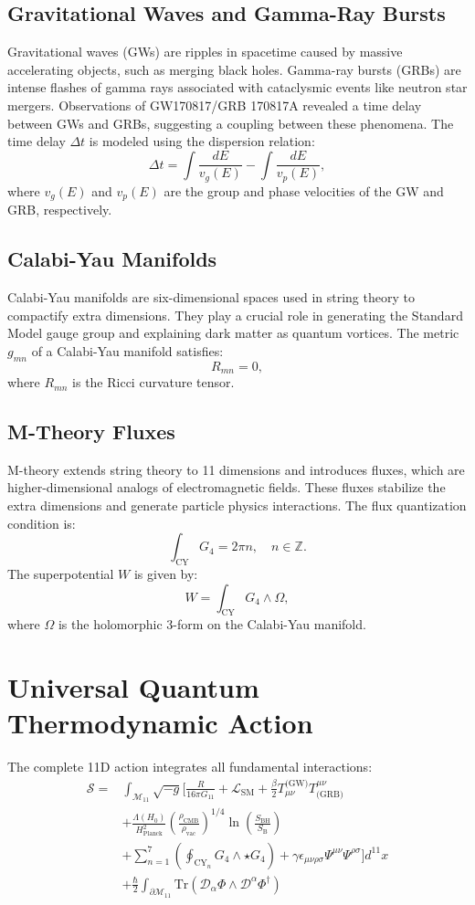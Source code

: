 \documentclass[12pt, a4paper]{article}
\begin{document}
\subsection{Gravitational Waves and Gamma-Ray Bursts}
Gravitational waves (GWs) are ripples in spacetime caused by massive accelerating objects, such as merging black holes. Gamma-ray bursts (GRBs) are intense flashes of gamma rays associated with cataclysmic events like neutron star mergers. Observations of GW170817/GRB 170817A revealed a time delay between GWs and GRBs, suggesting a coupling between these phenomena. The time delay \(\Delta t\) is modeled using the dispersion relation:
\[
\Delta t = \int \frac{dE}{v_g(E)} - \int \frac{dE}{v_p(E)},
\]
where \(v_g(E)\) and \(v_p(E)\) are the group and phase velocities of the GW and GRB, respectively.

\subsection{Calabi-Yau Manifolds}
Calabi-Yau manifolds are six-dimensional spaces used in string theory to compactify extra dimensions. They play a crucial role in generating the Standard Model gauge group and explaining dark matter as quantum vortices. The metric \(g_{mn}\) of a Calabi-Yau manifold satisfies:
\[
R_{mn} = 0,
\]
where \(R_{mn}\) is the Ricci curvature tensor.

\subsection{M-Theory Fluxes}
M-theory extends string theory to 11 dimensions and introduces fluxes, which are higher-dimensional analogs of electromagnetic fields. These fluxes stabilize the extra dimensions and generate particle physics interactions. The flux quantization condition is:
\[
\int_{\text{CY}} G_4 = 2\pi n, \quad n \in \mathbb{Z}.
\]
The superpotential \(W\) is given by:
\[
W = \int_{\text{CY}} G_4 \wedge \Omega,
\]
where \(\Omega\) is the holomorphic 3-form on the Calabi-Yau manifold.

\section{Universal Quantum Thermodynamic Action}
The complete 11D action integrates all fundamental interactions:
\[
\boxed{
\begin{aligned}
\mathcal{S} = & \int_{\mathcal{M}_{11}} \sqrt{-g} \Bigg[ \frac{R}{16\pi G_{11}} + \mathcal{L}_{\text{SM}} + \frac{\beta}{2} T_{\mu\nu}^{\text{(GW)}} T^{\mu\nu}_{\text{(GRB)}} \\
& + \frac{\Lambda(H_0)}{H_{\text{Planck}}^2} \left( \frac{\rho_{\text{CMB}}}{\rho_{\text{vac}}} \right)^{1/4} \ln\left(\frac{S_{\text{BH}}}{S_{\text{B}}}\right) \\
& + \sum_{n=1}^7 \left( \oint_{\text{CY}_n} G_4 \wedge \star G_4 \right) + \gamma \epsilon_{\mu\nu\rho\sigma} \Psi^{\mu\nu} \Psi^{\rho\sigma} \Bigg] d^{11}x \\
& + \frac{\hbar}{2} \int_{\partial\mathcal{M}_{11}} \text{Tr}\left( \mathcal{D}_\alpha \Phi \wedge \mathcal{D}^\alpha \Phi^\dagger \right)
\end{aligned}
}
\]
\end{document}
